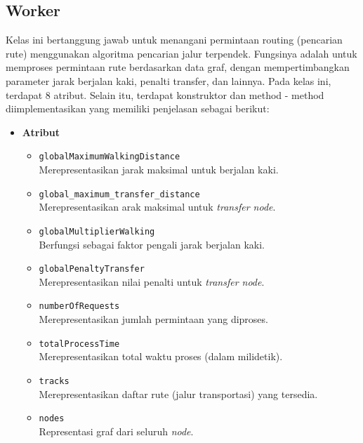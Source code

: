\subsection{Worker}
Kelas ini bertanggung jawab untuk menangani permintaan routing (pencarian rute) menggunakan algoritma pencarian jalur terpendek. Fungsinya adalah untuk memproses permintaan rute berdasarkan data graf, dengan mempertimbangkan parameter jarak berjalan kaki, penalti transfer, dan lainnya. Pada kelas ini, terdapat 8 atribut. Selain itu, terdapat konstruktor dan method - method diimplementasikan yang memiliki penjelasan sebagai berikut:
\begin{itemize}
    \item \textbf{Atribut}
    \begin{itemize}
        \item \texttt{globalMaximumWalkingDistance}
        \\ Merepresentasikan jarak maksimal untuk berjalan kaki.
        \item \texttt{global\_maximum\_transfer\_distance}
        \\ Merepresentasikan arak maksimal untuk \textit{transfer node}.
        \item \texttt{globalMultiplierWalking}
        \\ Berfungsi sebagai faktor pengali jarak berjalan kaki.
        \item \texttt{globalPenaltyTransfer}
        \\ Merepresentasikan nilai penalti untuk \textit{transfer node}.
        \item \texttt{numberOfRequests}
        \\ Merepresentasikan jumlah permintaan yang diproses.
        \item \texttt{totalProcessTime}
        \\ Merepresentasikan total waktu proses (dalam milidetik).
        \item \texttt{tracks}
        \\ Merepresentasikan daftar rute (jalur transportasi) yang tersedia.
        \item \texttt{nodes}
        \\ Representasi graf dari seluruh \textit{node}.
    \end{itemize}


\end{itemize}
